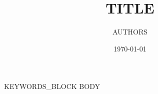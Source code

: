 \documentclass[11pt]{article}
\title{{{TITLE}}}
\author{{{AUTHORS}}}
\date{\today}
\begin{document}
\maketitle

{{KEYWORDS_BLOCK}}
{{BODY}}



\end{document}
